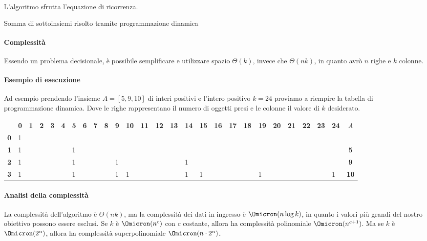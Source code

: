 L'algoritmo sfrutta l'equazione di ricorrenza.

\begin{algorithm}[H]
	\caption{Somma di sottoinsiemi risolto tramite programmazione dinamica}
	
\end{algorithm}

\paragraph{Complessità}
Essendo un problema decisionale, è possibile semplificare e utilizzare spazio \(\Theta(k)\), invece che \(\Theta(nk)\), in quanto avrò \(n\) righe e \(k\) colonne.

\paragraph{Esempio di esecuzione}
Ad esempio prendendo l'insieme \(A = [5,9,10]\) di interi positivi e l'intero positivo \(k = 24\) proviamo a riempire la tabella di programmazione dinamica.
Dove le righe rappresentano il numero di oggetti presi e le colonne il valore di \(k\) desiderato.

{
\setlength{\tabcolsep}{3pt}
\begin{tabularx}{\textwidth}{@{} l *{25}{ F{Y} } c @{}}
	\toprule
		& \textbf{0} & \textbf{1} & \textbf{2} & \textbf{3} & \textbf{4} & \textbf{5} & \textbf{6} & \textbf{7} & \textbf{8} & \textbf{9} & \textbf{10} & \textbf{11} & \textbf{12} & \textbf{13} & \textbf{14} & \textbf{15} & \textbf{16} & \textbf{17} & \textbf{18} & \textbf{19} & \textbf{20} & \textbf{21} & \textbf{22} & \textbf{23} & \textbf{24} & \emph{A}\\
		\textbf{0} & 1 &&&&&&&&&&&&&&&&&&&&&&&&\\
	\lightrule
		\textbf{1} & 1 &&&&& 1 &&&&&&&&&&&&&&&&&&&& \textbf{5}\\
	\lightrule
		\textbf{2} & 1 &&&&& 1 &&&& 1 &&&&& 1 &&&&&&&&&&& \textbf{9}\\
	\lightrule
		\textbf{3} & 1 &&&&& 1 &&&&1 & 1 &&&& 1 & 1 &&&& 1 &&&&& 1& \textbf{10}\\
	\bottomrule
\end{tabularx}
}

\paragraph{Analisi della complessità}
La complessità dell'algoritmo è \(\Theta(nk)\), ma la complessità dei dati in ingresso è \(\Omicron(n \log k)\), in quanto i valori più grandi del nostro obiettivo possono essere esclusi.
Se \(k\) è \(\Omicron(n^c)\) con \(c\) costante, allora \subSetSum ha complessità polinomiale \(\Omicron(n^{c+1})\).
Ma se \(k\) è  \(\Omicron(2^n)\), allora \subSetSum ha complessità superpolinomiale \(\Omicron(n \cdot 2^{n})\).

